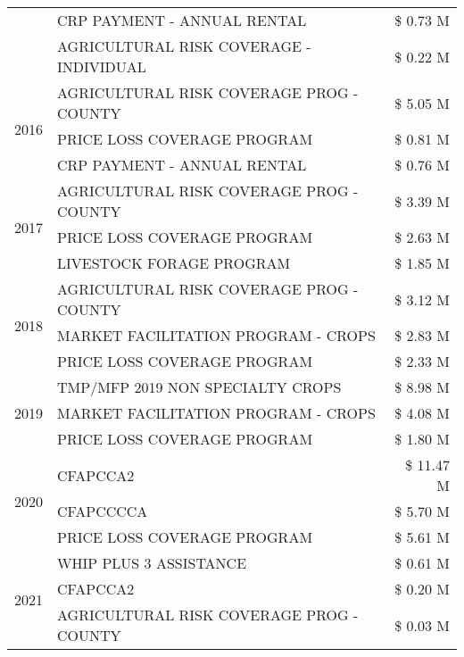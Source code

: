 \begin{tabular}{llr}
 & CRP PAYMENT - ANNUAL RENTAL & \$ 0.73 M \\
 & AGRICULTURAL RISK COVERAGE - INDIVIDUAL & \$ 0.22 M \\
\cline{1-3}
\multirow[t]{3}{*}{2016} & AGRICULTURAL RISK COVERAGE PROG - COUNTY & \$ 5.05 M \\
 & PRICE LOSS COVERAGE PROGRAM & \$ 0.81 M \\
 & CRP PAYMENT - ANNUAL RENTAL & \$ 0.76 M \\
\cline{1-3}
\multirow[t]{3}{*}{2017} & AGRICULTURAL RISK COVERAGE PROG - COUNTY & \$ 3.39 M \\
 & PRICE LOSS COVERAGE PROGRAM & \$ 2.63 M \\
 & LIVESTOCK FORAGE PROGRAM & \$ 1.85 M \\
\cline{1-3}
\multirow[t]{3}{*}{2018} & AGRICULTURAL RISK COVERAGE PROG - COUNTY & \$ 3.12 M \\
 & MARKET FACILITATION PROGRAM - CROPS & \$ 2.83 M \\
 & PRICE LOSS COVERAGE PROGRAM & \$ 2.33 M \\
\cline{1-3}
\multirow[t]{3}{*}{2019} & TMP/MFP 2019 NON SPECIALTY CROPS & \$ 8.98 M \\
 & MARKET FACILITATION PROGRAM - CROPS & \$ 4.08 M \\
 & PRICE LOSS COVERAGE PROGRAM & \$ 1.80 M \\
\cline{1-3}
\multirow[t]{3}{*}{2020} & CFAPCCA2 & \$ 11.47 M \\
 & CFAPCCCCA & \$ 5.70 M \\
 & PRICE LOSS COVERAGE PROGRAM & \$ 5.61 M \\
\cline{1-3}
\multirow[t]{3}{*}{2021} & WHIP PLUS 3 ASSISTANCE & \$ 0.61 M \\
 & CFAPCCA2 & \$ 0.20 M \\
 & AGRICULTURAL RISK COVERAGE PROG - COUNTY & \$ 0.03 M \\
\cline{1-3}
\bottomrule
\end{tabular}
